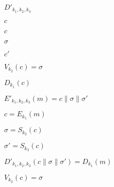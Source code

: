 \documentclass[10pt]{book}
\begin{document}
\begin{mdSnippets}
\begin{mdInlineSnippet}[ca4c61ee2718280f5b1991aa6ec1c5cd]
$D'_{k_1, k_2, k_3}$\end{mdInlineSnippet}%
\begin{mdInlineSnippet}[4a8a08f09d37b73795649038408b5f33]%
$c$\end{mdInlineSnippet}%
\begin{mdInlineSnippet}[4a8a08f09d37b73795649038408b5f33]%
$c$\end{mdInlineSnippet}%
\begin{mdInlineSnippet}[a2ab7d71a0f07f388ff823293c147d21]%
$\sigma$\end{mdInlineSnippet}%
\begin{mdInlineSnippet}[12c7acffa10294560a339fa9f4796b80]%
$c'$\end{mdInlineSnippet}%
\begin{mdInlineSnippet}%
$V_{k_2}(c) = \sigma$\end{mdInlineSnippet}%
\begin{mdInlineSnippet}[5ca38eb818d43697a927adffbcfdb0fe]%
$D_{k_1}(c)$\end{mdInlineSnippet}%
\begin{mdInlineSnippet}[dc5d1ef97ba9f111102b69f35e1a3b2d]%
$E'_{k_1,k_2,k_3}(m) = c\|\sigma\|\sigma'$\end{mdInlineSnippet}%
\begin{mdInlineSnippet}%
$c=E_{k_1}(m)$\end{mdInlineSnippet}%
\begin{mdInlineSnippet}[c166f30e21d90159f3d73e2b6a44a225]%
$\sigma=S_{k_2}(c)$\end{mdInlineSnippet}%
\begin{mdInlineSnippet}[944a3a7552a7c2dd09c95c2de5045fe7]%
$\sigma'=S_{k_3}(c)$\end{mdInlineSnippet}%
\begin{mdInlineSnippet}[5f3759e058e65d2a01427d967a1021ad]%
$D'_{k_1,k_2,k_3}(c\|\sigma\|\sigma')=D_{k_1}(m)$\end{mdInlineSnippet}%
\begin{mdInlineSnippet}%
$V_{k_2}(c)=\sigma$\end{mdInlineSnippet}%
\begin{mdInlineSnippet}[73c9ec4c45c3942c02cf50d63e28eeb8]%

\end{mdInlineSnippet}
\end{mdSnippets}
\end{document}
